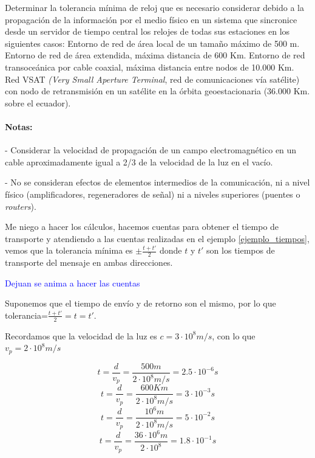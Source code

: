  \begin{problem}[11]
  Determinar la tolerancia mínima de reloj que es necesario considerar
  debido a la propagación de la información por el medio físico en un sistema
  que sincronice desde un servidor de tiempo central los relojes de todas
  sus estaciones en los siguientes casos:
    \ppart Entorno de red de área local de un tamaño máximo de 500 m.
    \ppart Entorno de red de área extendida, máxima distancia de 600 Km.
    \ppart Entorno de red transoceánica por cable coaxial, máxima distancia entre
nodos de 10.000 Km.
    \ppart Red VSAT \textit{(Very Small Aperture Terminal}, red de comunicaciones vía
satélite) con nodo de retransmisión en un satélite en la órbita geoestacionaria
(36.000 Km. sobre el ecuador).
  \paragraph{Notas: }
  - Considerar la velocidad de propagación de un campo electromagnético
en un cable aproximadamente igual a 2/3 de la velocidad de la luz en el
vacío.

  - No se consideran efectos de elementos intermedios de la comunicación,
  ni a nivel físico (amplificadores,  regeneradores de señal) ni a niveles
  superiores (puentes o \textit{routers}).

  \solution

  \yoP

  Me niego a hacer los cálculos, hacemos cuentas para obtener el tiempo de transporte y atendiendo a las cuentas realizadas en el ejemplo \ref{ejemplo_tiempos}, vemos que la tolerancia mínima es $\pm\frac{t+t'}{2}$ donde $t$ y $t'$ son los tiempos de transporte del mensaje en ambas direcciones.

\textcolor{blue}{Dejuan se anima a hacer las cuentas}

Suponemos que el tiempo de envío y de retorno son el mismo, por lo que tolerancia=$\frac{t+t'}{2}=t=t'$.

Recordamos que la velocidad de la luz es $c=3·10^8 m/s$, con lo que $v_p=2·10^8m/s$


\spart
\[
t = \frac{d}{v_p} = \frac{500m}{2·10^8m/s} = 2.5·10^{-6}  s
\]
\spart
\[
t = \frac{d}{v_p} = \frac{600Km}{2·10^8m/s} = 3·10^{-3} s
\]
\spart
\[
t = \frac{d}{v_p} = \frac{10^6m}{2·10^8m/s} = 5·10^{-2} s
\]
\spart
\[
t = \frac{d}{v_p} = \frac{36·10^6m}{2·10^8} =  1.8·10^{-1} s
\]
  \end{problem}

